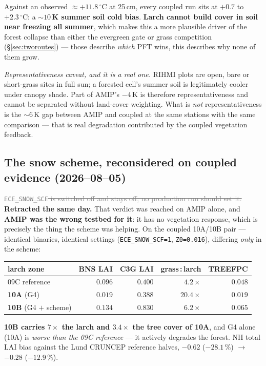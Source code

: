 \documentclass[10pt]{article}
\newcommand{\dead}[1]{\textcolor{gray}{\sout{#1}}}
\begin{document}
\noindent Against an observed ${\approx}+11.8\,^\circ$C at 25\,cm, every coupled run sits at
$+0.7$ to $+2.3\,^\circ$C: a \textbf{${\sim}10$\,K summer soil cold bias}. \textbf{Larch cannot
build cover in soil near freezing all summer}, which makes this a more plausible driver of the
forest collapse than either the evergreen gate or grass competition (\S\ref{sec:tworoutes}) ---
those describe \emph{which} PFT wins, this describes why none of them grow.

\emph{Representativeness caveat, and it is a real one.} RIHMI plots are open, bare or
short-grass sites in full sun; a forested cell's summer soil is legitimately cooler under
canopy shade. Part of AMIP's $-4$\,K is therefore representativeness and cannot be separated
without land-cover weighting. What is \emph{not} representativeness is the ${\sim}6$\,K gap
between AMIP and coupled at the same stations with the same comparison --- that is real
degradation contributed by the coupled vegetation feedback.

\subsection{The snow scheme, reconsidered on coupled evidence (2026--08--05)}\label{sub:scfoff}
\dead{\texttt{ECE\_SNOW\_SCF} is switched off and stays off; no production run should set it.}
\textbf{Retracted the same day.} That verdict was reached on AMIP alone, and \textbf{AMIP was
the wrong testbed for it}: it has no vegetation response, which is precisely the thing the
scheme was helping. On the coupled 10A/10B pair --- identical binaries, identical settings
(\texttt{ECE\_SNOW\_SCF=1}, \texttt{Z0=0.016}), differing \emph{only} in the scheme:

\begin{center}\footnotesize
\begin{tabular}{l r r r r}
\toprule
larch zone & BNS LAI & C3G LAI & grass\,:\,larch & TREEFPC \\
\midrule
09C reference & $0.096$ & $0.400$ & $4.2\times$ & $0.048$ \\
\textbf{10A} (G4) & $\mathbf{0.019}$ & $0.388$ & $\mathbf{20.4\times}$ & $\mathbf{0.019}$ \\
\textbf{10B} (G4 $+$ scheme) & $\mathbf{0.134}$ & $0.830$ & $6.2\times$ & $\mathbf{0.065}$ \\
\bottomrule
\end{tabular}
\end{center}

\noindent \textbf{10B carries $7\times$ the larch and $3.4\times$ the tree cover of 10A}, and
G4 alone (10A) is \emph{worse than the 09C reference} --- it actively degrades the forest. NH
total LAI bias against the Lund CRUNCEP reference halves, $-0.62$ ($-28.1\,\%$) $\to$ $-0.28$
($-12.9\,\%$).
\end{document}
